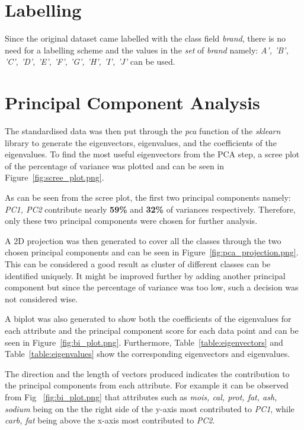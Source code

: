 \documentclass[preprint,12pt]{elsarticle}
\begin{document}
\section{Labelling}
\label{ss:Labelling}
Since the original dataset came labelled with the class field \textit{brand}, there is no need for a labelling scheme and the values in the \textit{set} of \textit{brand} namely:
\textit{A', 'B', 'C', 'D', 'E', 'F', 'G', 'H', 'I', 'J'} can be used.

\section{Principal Component Analysis}
\label{ss:PrincipalComponentAnalysis}
The standardised data was then put through the \textit{pca} function of the \textit{sklearn} library \cite{pca2020} to generate the eigenvectors, eigenvalues, and the coefficients
of the eigenvalues. To find the most useful eigenvectors from the PCA step, a scree plot of the percentage of variance was plotted and can be seen in Figure~\ref{fig:scree_plot.png}.
\par
As can be seen from the scree plot, the first two principal components namely: \textit{PC1, PC2} contribute nearly \textbf{59\% }and \textbf{32\% }of variances respectively.
Therefore, only these two principal components were chosen for further analysis.
\par
A 2D projection was then generated to cover all the classes through the two chosen principal components and can be seen in Figure~\ref{fig:pca_projection.png}.
This can be considered a good result as cluster of different classes can be identified uniquely. It might be improved further by adding another principal component
but since the percentage of variance was too low, such a decision was not considered wise.
\par
A biplot was also generated to show both the coefficients of the eigenvalues for each attribute and the principal component score for each data point and can be 
seen in Figure~\ref{fig:bi_plot.png}. Furthermore, Table~\ref{table:eigenvectors} and Table~\ref{table:eigenvalues} show the corresponding eigenvectors and eigenvalues.
\par
The direction and the length of vectors produced indicates the contribution to the principal components from each attribute. For example it can be observed from Fig ~\ref{fig:bi_plot.png} that attributes such as \textit{mois, cal, prot, fat, ash, sodium} being on the the right side of the y-axis most contributed to \textit{PC1}, while 
\textit{carb, fat} being above the x-axis most contributed to \textit{PC2}.
\end{document}
